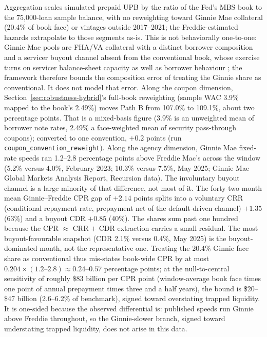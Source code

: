 \documentclass[12pt]{article}
\begin{document}
Aggregation scales simulated prepaid UPB by the ratio of the Fed's MBS book to the 75,000-loan sample balance, with no reweighting toward Ginnie Mae collateral (20.4\% of book face) or vintages outside 2017--2021; the Freddie-estimated hazards extrapolate to those segments as-is. This is not behaviorally one-to-one: Ginnie Mae pools are FHA/VA collateral with a distinct borrower composition and a servicer buyout channel absent from the conventional book, whose exercise turns on servicer balance-sheet capacity as well as borrower behaviour \citep{aiello2022}; the framework therefore bounds the composition error of treating the Ginnie share as conventional. It does not model that error. Along the coupon dimension, Section~\ref{sec:robustness-hybrid}'s full-book reweighting (sample WAC 3.9\% mapped to the book's 2.49\%) moves Path B from 107.0\% to 109.1\%, about two percentage points. That is a mixed-basis figure (3.9\% is an unweighted mean of borrower note rates, 2.49\% a face-weighted mean of security pass-through coupons); converted to one convention, $+0.2$ points (run \texttt{coupon\_convention\_reweight}). Along the agency dimension, Ginnie Mae fixed-rate speeds ran 1.2--2.8 percentage points above Freddie Mac's across the window (5.2\% versus 4.0\%, February 2023; 10.3\% versus 7.5\%, May 2025; Ginnie Mae Global Markets Analysis Report, Recursion data). The involuntary buyout channel is a large minority of that difference, not most of it. The forty-two-month mean Ginnie--Freddie CPR gap of $+2.14$ points splits into a voluntary CRR (conditional repayment rate, prepayment net of the default-driven channel) $+1.35$ (63\%) and a buyout CDR $+0.85$ (40\%). The shares sum past one hundred because the CPR $\approx$ CRR $+$ CDR extraction carries a small residual. The most buyout-favourable snapshot (CDR 2.1\% versus 0.4\%, May 2025) is the buyout-dominated month, not the representative one. Treating the 20.4\% Ginnie face share as conventional thus mis-states book-wide CPR by at most $0.204 \times (1.2\text{--}2.8) \approx 0.24$--$0.57$ percentage points; at the null-to-central sensitivity of roughly \$83 billion per CPR point (window-average book face times one point of annual prepayment times three and a half years), the bound is \$20--\$47 billion (2.6--6.2\% of benchmark), signed toward overstating trapped liquidity. It is one-sided because the observed differential is: published speeds run Ginnie above Freddie throughout, so the Ginnie-slower branch, signed toward understating trapped liquidity, does not arise in this data.
\end{document}
